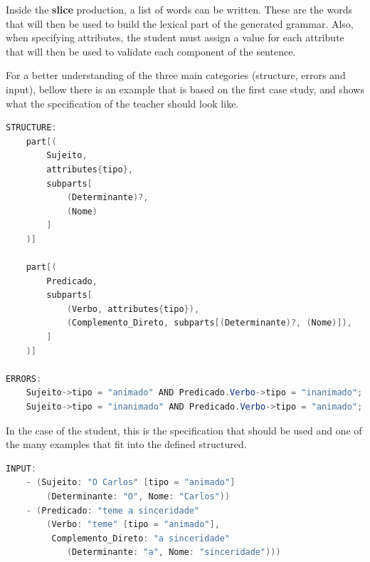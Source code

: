 Inside the \textbf{slice} production, a list of words can be written. These are the words that will then be used to build the lexical part of the generated grammar. Also, when specifying attributes, the student must assign a value for each attribute that will then be used to validate each component of the sentence.

For a better understanding of the three main categories (structure, errors and input), bellow there is an example that is based on the first case study, and shows what the specification of the teacher should look like.

\begin{center}
\begin{minipage}{16cm}
\begin{lstlisting}[language=java, basicstyle=\small, label={lst:metaStruct}, caption=Example of a possible sentence structure]
STRUCTURE:
	part[(
        Sujeito, 
        attributes{tipo}, 
        subparts[
            (Determinante)?, 
            (Nome)
        ]
	)]
    
	part[(
        Predicado,
        subparts[
            (Verbo, attributes{tipo}),
            (Complemento_Direto, subparts[(Determinante)?, (Nome)]),
        ]
	)]

ERRORS:
    Sujeito->tipo = "animado" AND Predicado.Verbo->tipo = "inanimado";
    Sujeito->tipo = "inanimado" AND Predicado.Verbo->tipo = "animado";
\end{lstlisting}
\end{minipage}
\end{center}

In the case of the student, this is the specification that should be used and one of the many examples that fit into the defined structured.

\begin{center}
\begin{minipage}{13cm}
\begin{lstlisting}[language=java, basicstyle=\small, label={lst:metaInput}, caption=Example of the students parsing]
INPUT:
    - (Sujeito: "O Carlos" [tipo = "animado"]
        (Determinante: "O", Nome: "Carlos"))
    - (Predicado: "teme a sinceridade" 
        (Verbo: "teme" [tipo = "animado"], 
         Complemento_Direto: "a sinceridade" 
            (Determinante: "a", Nome: "sinceridade")))
\end{lstlisting}
\end{minipage}
\end{center}



